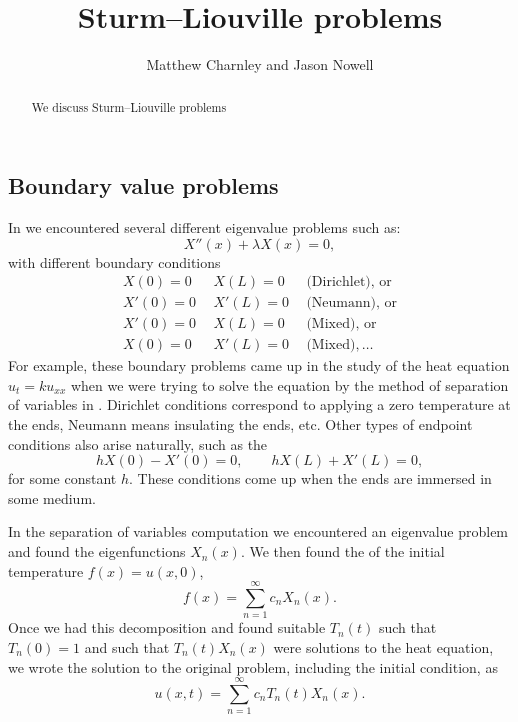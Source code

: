 \documentclass{ximera}
\title{Sturm--Liouville problems}
\author{Matthew Charnley and Jason Nowell}
\begin{document}
\begin{abstract}
    We discuss Sturm--Liouville problems
\end{abstract}
\maketitle

\label{slproblems:section}

\subsection{Boundary value problems}

In  we encountered several different eigenvalue problems such as:
\begin{equation*}
    X''(x) + \lambda X(x) = 0 ,
\end{equation*}
with different boundary conditions
%
%
\begin{equation*}
    \begin{array}{rrl}
        X(0) = 0 & ~~X(L) = 0 & ~~\text{(Dirichlet), or} \\
        X'(0) = 0 & ~~X'(L) = 0 & ~~\text{(Neumann), or} \\
        X'(0) = 0 & ~~X(L) = 0 & ~~\text{(Mixed), or} \\
        X(0) = 0 & ~~X'(L) = 0 & ~~\text{(Mixed)}, \ldots
    \end{array}
\end{equation*}
For example, these boundary problems came up in the study of the heat equation $u_t = k u_{xx}$ when we were trying to solve the equation by the method of separation of variables in . Dirichlet conditions correspond to applying a zero temperature at the ends, Neumann means insulating the ends, etc. Other types of endpoint conditions also arise naturally, such as the \emph{}
\begin{equation*}
    hX(0) - X'(0) = 0, \qquad hX(L) + X'(L) = 0 ,
\end{equation*}
for some constant $h$.  These conditions come up when the ends are immersed in some medium.

In the separation of variables computation we encountered an eigenvalue problem and found the eigenfunctions $X_n(x)$.  We then found the \emph{} of the initial temperature $f(x) = u(x,0)$,
\begin{equation*}
    f(x) = \sum_{n=1}^\infty c_n X_n(x) .
\end{equation*}
Once we had this decomposition and found suitable $T_n(t)$ such that $T_n(0) = 1$ and such that $T_n(t)X_n(x)$ were solutions to the heat equation, we wrote the solution to the original problem, including the initial condition, as
\begin{equation*}
    u(x,t) = \sum_{n=1}^\infty c_n T_n(t) X_n(x) .
\end{equation*}
\end{document}

